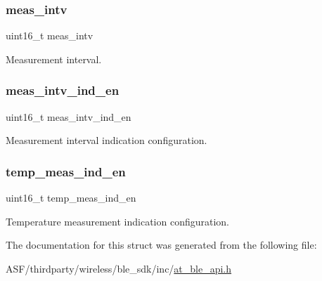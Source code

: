 \subsubsection{\texorpdfstring{meas\_intv}{meas\_intv}}
{\footnotesize\ttfamily uint16\+\_\+t meas\+\_\+intv}



Measurement interval. 

\mbox{\label{structat__ble__htpt__disable__ind__t_a20cab139a2b25a895fd964bda74eecc4}} 
\subsubsection{\texorpdfstring{meas\_intv\_ind\_en}{meas\_intv\_ind\_en}}
{\footnotesize\ttfamily uint16\+\_\+t meas\+\_\+intv\+\_\+ind\+\_\+en}



Measurement interval indication configuration. 

\mbox{\label{structat__ble__htpt__disable__ind__t_aff30ce6defa6c926c2c960d839c49096}} 
\subsubsection{\texorpdfstring{temp\_meas\_ind\_en}{temp\_meas\_ind\_en}}
{\footnotesize\ttfamily uint16\+\_\+t temp\+\_\+meas\+\_\+ind\+\_\+en}



Temperature measurement indication configuration. 



The documentation for this struct was generated from the following file\+:\begin{DoxyCompactItemize}
\item 
A\+S\+F/thirdparty/wireless/ble\+\_\+sdk/inc/\mbox{\hyperlink{at__ble__api_8h}{at\+\_\+ble\+\_\+api.\+h}}\end{DoxyCompactItemize}
